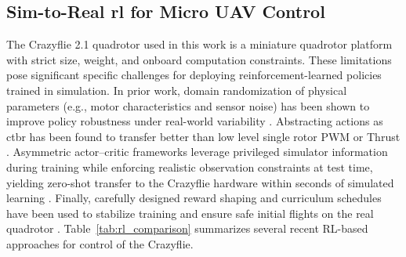 \subsection{Sim-to-Real \gls{rl} for Micro UAV Control}
The Crazyflie 2.1 quadrotor used in this work is a miniature quadrotor platform with strict size, weight, and onboard computation constraints. These limitations pose significant specific challenges for deploying reinforcement-learned policies trained in simulation. In prior work, domain randomization of physical parameters (e.g., motor characteristics and sensor noise) has been shown to improve policy robustness under real-world variability \autocite{molchanov_sim--multi-real_2019}. Abstracting actions as \gls{ctbr} has been found to transfer better than low level single rotor PWM or Thrust  \autocite{kaufmann_benchmark_2022}. Asymmetric actor–critic frameworks leverage privileged simulator information during training while enforcing realistic observation constraints at test time, yielding zero-shot transfer to the Crazyflie hardware within seconds of simulated learning \autocite{eschmann_learning_2024}. Finally, carefully designed reward shaping and curriculum schedules have been used to stabilize training and ensure safe initial flights on the real quadrotor \autocite{chen_what_2024}. Table~\ref{tab:rl_comparison} summarizes several recent RL-based approaches for control of the Crazyflie.
